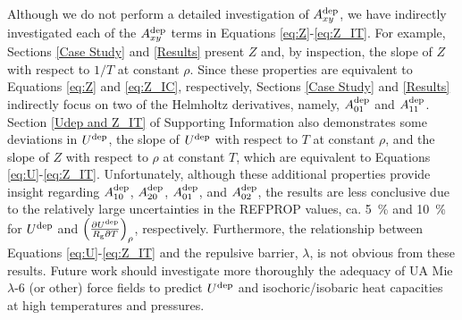 \documentclass[preprint,letterpaper,floatfix,citeautoscript,aip,jcp]{revtex4-1}
\begin{document}
Although we do not perform a detailed investigation of $A_{xy}^{\rm dep}$, we have indirectly investigated each of the $A_{xy}^{\rm dep}$ terms in Equations \ref{eq:Z}-\ref{eq:Z_IT}. For example, Sections \ref{Case Study} and \ref{Results} present $Z$ and, by inspection, the slope of $Z$ with respect to $1/T$ at constant $\rho$. Since these properties are equivalent to Equations \ref{eq:Z} and \ref{eq:Z_IC}, respectively, Sections \ref{Case Study} and \ref{Results} indirectly focus on two of the Helmholtz derivatives, namely, $A_{01}^{\rm dep}$ and $A_{11}^{\rm dep}$. Section \ref{Udep and Z_IT} of Supporting Information also demonstrates some deviations in $U^{\rm dep}$, the slope of $U^{\rm dep}$ with respect to $T$ at constant $\rho$, and the slope of $Z$ with respect to $\rho$ at constant $T$, which are equivalent to Equations \ref{eq:U}-\ref{eq:Z_IT}. Unfortunately, although these additional properties provide insight regarding $A_{10}^{\rm dep}$, $A_{20}^{\rm dep}$, $A_{01}^{\rm dep}$, and $A_{02}^{\rm dep}$, the results are less conclusive due to the relatively large uncertainties in the REFPROP values, ca. 5~\% and 10~\% for $U^{\rm dep}$ and $\left(\frac{\partial U^{\rm dep}}{R_{\rm g} \partial T}\right)_\rho$, respectively. Furthermore, the relationship between Equations \ref{eq:U}-\ref{eq:Z_IT} and the repulsive barrier, $\lambda$, is not obvious from these results. Future work should investigate more thoroughly the adequacy of UA Mie $\lambda$-6 (or other) force fields to predict $U^{\rm dep}$ and isochoric/isobaric heat capacities at high temperatures and pressures.

\end{document}
